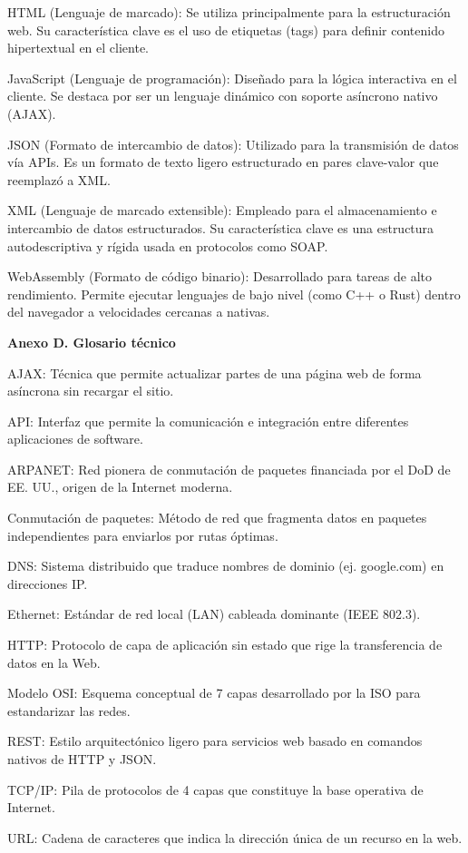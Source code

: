 HTML (Lenguaje de marcado): Se utiliza principalmente para la
estructuración web. Su característica clave es el uso de etiquetas
(tags) para definir contenido hipertextual en el cliente.

JavaScript (Lenguaje de programación): Diseñado para la lógica
interactiva en el cliente. Se destaca por ser un lenguaje dinámico con
soporte asíncrono nativo (AJAX).

JSON (Formato de intercambio de datos): Utilizado para la transmisión de
datos vía APIs. Es un formato de texto ligero estructurado en pares
clave-valor que reemplazó a XML.

XML (Lenguaje de marcado extensible): Empleado para el almacenamiento e
intercambio de datos estructurados. Su característica clave es una
estructura autodescriptiva y rígida usada en protocolos como SOAP.

WebAssembly (Formato de código binario): Desarrollado para tareas de
alto rendimiento. Permite ejecutar lenguajes de bajo nivel (como C++ o
Rust) dentro del navegador a velocidades cercanas a nativas.

\textbf{Anexo D. Glosario técnico}

AJAX: Técnica que permite actualizar partes de una página web de forma
asíncrona sin recargar el sitio.

API: Interfaz que permite la comunicación e integración entre diferentes
aplicaciones de software.

ARPANET: Red pionera de conmutación de paquetes financiada por el DoD de
EE. UU., origen de la Internet moderna.

Conmutación de paquetes: Método de red que fragmenta datos en paquetes
independientes para enviarlos por rutas óptimas.

DNS: Sistema distribuido que traduce nombres de dominio (ej. google.com)
en direcciones IP.

Ethernet: Estándar de red local (LAN) cableada dominante (IEEE 802.3).

HTTP: Protocolo de capa de aplicación sin estado que rige la
transferencia de datos en la Web.

Modelo OSI: Esquema conceptual de 7 capas desarrollado por la ISO para
estandarizar las redes.

REST: Estilo arquitectónico ligero para servicios web basado en comandos
nativos de HTTP y JSON.

TCP/IP: Pila de protocolos de 4 capas que constituye la base operativa
de Internet.

URL: Cadena de caracteres que indica la dirección única de un recurso en
la web.

